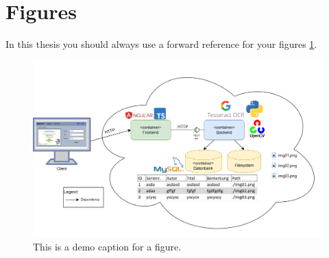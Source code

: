 \section*{Figures}
In this thesis you should always use a forward reference for your figures \ref{fig:demo}.
\begin{figure}[ht]
    \centering
    \includegraphics[width=\textwidth,height=\textheight,keepaspectratio]{images/demo.png}
    \caption{This is a demo caption for a figure.}
    \label{fig:demo}
\end{figure}


